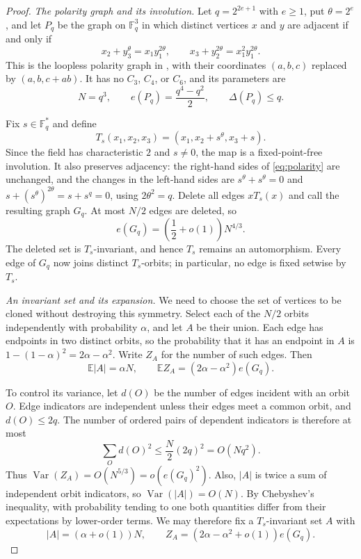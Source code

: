 \documentclass{article}
\newcommand{\FF}{\mathbb{F}}
\theoremstyle{definition}
\theoremstyle{remark}
\begin{document}
\begin{proof}
\emph{The polarity graph and its involution.}
Let $q=2^{2e+1}$ with $e\geq1$, put $\theta=2^e$, and let $P_q$ be
the graph on $\FF_q^3$ in which distinct vertices $x$ and $y$ are adjacent
if and only if
\begin{equation}\label{eq:polarity}
x_2+y_3^\theta=x_1y_1^{2\theta},\qquad
x_3+y_2^{2\theta}=x_1^2y_1^{2\theta}.
\end{equation}
This is the loopless polarity graph in \cite[Section~3]{LUW1999}, with
their coordinates $(a,b,c)$ replaced by $(a,b,c+ab)$.  It has no
$C_3$, $C_4$, or $C_6$, and its parameters are
\begin{equation}\label{eq:polarity-parameters}
N=q^3,\qquad e(P_q)=\frac{q^4-q^2}{2},\qquad\Delta(P_q)\leq q.
\end{equation}

Fix $s\in\FF_q^*$ and define
\[
T_s(x_1,x_2,x_3)=(x_1,x_2+s^\theta,x_3+s).
\]
Since the field has
characteristic $2$ and $s\neq0$, the map is a fixed-point-free
involution.  It also preserves adjacency: the right-hand sides of
\eqref{eq:polarity} are unchanged, and the changes in the left-hand
sides are $s^\theta+s^\theta=0$ and
$s+(s^\theta)^{2\theta}=s+s^q=0$, using $2\theta^2=q$.
Delete all edges $xT_s(x)$ and call the resulting graph $G_q$.  At
most $N/2$ edges are deleted, so
\begin{equation}\label{eq:Gq-edges}
e(G_q)=\left(\frac12+o(1)\right)N^{4/3}.
\end{equation}
The deleted set is $T_s$-invariant, and hence $T_s$ remains an
automorphism.  Every edge of $G_q$ now joins distinct $T_s$-orbits;
in particular, no edge is fixed setwise by $T_s$.

\emph{An invariant set and its expansion.}
We need to choose the set of vertices to be cloned without destroying
this symmetry.  Select each of the $N/2$ orbits independently with
probability $\alpha$, and let $A$ be their union.  Each edge has endpoints
in two distinct orbits, so the probability that it has an endpoint in $A$
is $1-(1-\alpha)^2=2\alpha-\alpha^2$.  Write $Z_A$ for the number
of such edges.  Then
\[
\mathbb E|A|=\alpha N,\qquad
\mathbb E Z_A=(2\alpha-\alpha^2)e(G_q).
\]

To control its variance, let $d(O)$ be the number of edges incident with
an orbit $O$.  Edge indicators are independent unless their edges meet a
common orbit, and $d(O)\leq2q$.  The number of ordered pairs of dependent
indicators is therefore at most
\[
\sum_Od(O)^2\leq\frac N2(2q)^2=O(Nq^2).
\]
Thus $\operatorname{Var}(Z_A)=O(N^{5/3})=o(e(G_q)^2)$.  Also,
$|A|$ is twice a sum of independent orbit indicators, so
$\operatorname{Var}(|A|)=O(N)$.  By Chebyshev's inequality, with
probability tending to one both quantities differ from their expectations
by lower-order terms.  We may therefore fix a $T_s$-invariant set $A$ with
\begin{equation}\label{eq:invariant-selection}
|A|=(\alpha+o(1))N,\qquad
Z_A=(2\alpha-\alpha^2+o(1))e(G_q).
\end{equation}


\end{proof}
\end{document}
